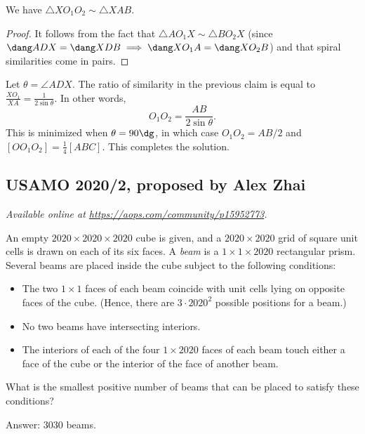 \documentclass[11pt]{scrartcl}
\begin{document}
\begin{claim*}
  We have $\triangle X O_1 O_2 \sim \triangle XAB$.
\end{claim*}
\begin{proof}
  It follows from the fact that $\triangle AO_1 X \sim \triangle BO_2 X$
  (since $\dang ADX = \dang XDB \implies \dang XO_1A = \dang XO_2B$)
  and that spiral similarities come in pairs.
\end{proof}

Let $\theta = \angle ADX$.
The ratio of similarity in the previous claim is equal to
$\frac{XO_1}{XA} = \frac{1}{2\sin \theta}$.
In other words,
\[ O_1 O_2 = \frac{AB}{2 \sin \theta}. \]
This is minimized when $\theta = 90\dg$,
in which case $O_1 O_2 = AB/2$
and $[OO_1O_2] = \frac14 [ABC]$.
This completes the solution.
\pagebreak

\subsection{USAMO 2020/2, proposed by Alex Zhai}
\textsl{Available online at \url{https://aops.com/community/p15952773}.}
\begin{mdframed}[style=mdpurplebox,frametitle={Problem statement}]
An empty $2020 \times 2020 \times 2020$ cube is given,
and a $2020 \times 2020$ grid of square unit cells is drawn on each of its six faces.
A \emph{beam} is a $1 \times 1 \times 2020$ rectangular prism.
Several beams are placed inside the cube subject to the following conditions:
\begin{itemize}
\item The two $1 \times 1$ faces of each beam coincide
  with unit cells lying on opposite faces of the cube.
  (Hence, there are $3 \cdot 2020^2$ possible positions for a beam.)
\item No two beams have intersecting interiors.
\item The interiors of each of the four $1 \times 2020$ faces of each beam touch
  either a face of the cube or the interior of the face of another beam.
\end{itemize}
What is the smallest positive number of beams that can be placed to satisfy these conditions?
\end{mdframed}
Answer: $3030$ beams.

\medskip
\end{document}
